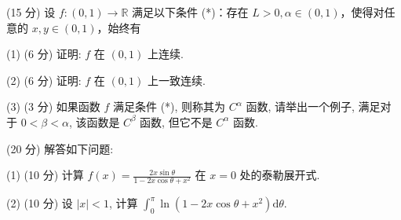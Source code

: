(15 分) 设 $f: (0,1) \to \mathbb{R}$ 满足以下条件 (*)：存在 $L > 0, \alpha \in (0,1)$，使得对任意的 $x, y \in (0,1)$，始终有\par
\nopagebreak[4]
(1) (6 分) 证明: $f$ 在 $(0,1)$ 上连续.\par
(2) (6 分) 证明: $f$ 在 $(0,1)$ 上一致连续.\par
(3) (3 分) 如果函数 $f$ 满足条件 (*), 则称其为 $C^\alpha$ 函数, 请举出一个例子, 满足对于 $0 < \beta < \alpha$, 该函数是 $C^\beta$ 函数, 但它不是 $C^\alpha$ 函数.\par
\par{}
(20 分) 解答如下问题:\par
(1) (10 分) 计算 $f(x) = \frac{2x\sin\theta}{1 - 2x\cos\theta + x^2}$ 在 $x = 0$ 处的泰勒展开式.\par
(2) (10 分) 设 $|x| < 1$, 计算 $\int_0^\pi \ln (1 - 2x\cos \theta + x^2)\mathrm{d}\theta$.\par
